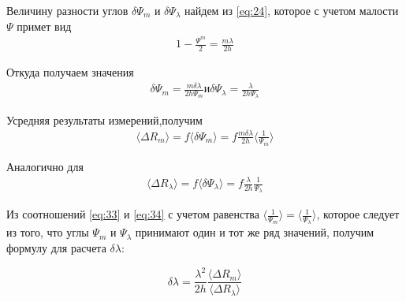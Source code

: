 Величину  разности углов $\delta \Psi_m$ и $\delta \Psi_{\lambda}$ найдем из \ref{eq:24}, которое с учетом малости $\Psi$ примет вид
\begin{gather}
	\label{eq:31}
	1-\frac{\Psi^m}{2}=\frac{m\lambda}{2h}
\end{gather}

Откуда получаем значения 
\begin{gather}
	\label{eq:32}
	\delta \Psi_m=\frac{m\delta \lambda}{2h\Psi_m} и \delta \Psi_{\lambda}=\frac{\lambda}{2h\Psi_{\lambda}}
\end{gather}

Усредняя результаты измерений,получим
\begin{gather}
	\label{eq:33}
 	\langle \Delta R_m \rangle  = f \langle\delta \Psi_m\rangle =f\frac{m\delta \lambda}{2h}  \langle\frac{1}{\Psi_m} \rangle
\end{gather}

Аналогично для
\begin{gather}
	\label{eq:34}
	\langle\Delta R_{\lambda}\rangle  = f \langle\delta \Psi_{\lambda}\rangle =f\frac{\lambda}{2h}  \frac{1}{\Psi_{\lambda}} 
\end{gather}

Из соотношений \ref{eq:33} и \ref{eq:34} с учетом равенства $ \langle\frac{1}{\Psi_m}\rangle = \langle\frac{1}{\Psi_{\lambda}} \rangle$, 
которое следует из того, что углы $\Psi_m$ и $\Psi_{\lambda}$ принимают один и тот же ряд значений, получим формулу для расчета $\delta \lambda$:





\begin{equation}
	\label{eq:35}
	\delta \lambda = \frac{\lambda^2}{2h} \frac{\langle \Delta R_m \rangle}{\langle \Delta R_{\lambda}\rangle}
\end{equation}

